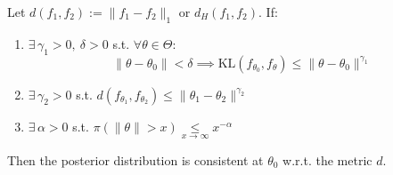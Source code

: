 \documentclass[11pt, a4paper]{article}
\newcommand{\KL}{\mathrm{KL}}
\newcounter{theorem}[section]
\begin{document}
\begin{theorem} \label{thm:param}
Let $d(f_1, f_2) := \|f_1 - f_2\|_1$ or $d_H(f_1, f_2)$. If:
\begin{enumerate}
    \item $\exists\, \gamma_1 > 0,\ \delta > 0$ s.t. $\forall \theta \in \Theta$:
    \[ \|\theta - \theta_0\| < \delta \implies \KL(f_{\theta_0}, f_\theta) \le \|\theta - \theta_0\|^{\gamma_1} \]
    \item $\exists\, \gamma_2 > 0$ s.t. $d(f_{\theta_1}, f_{\theta_2}) \le \|\theta_1 - \theta_2\|^{\gamma_2}$
    \item $\exists\, \alpha > 0$ s.t. $\pi(\|\theta\| > x) \underset{x \to \infty}{\le} x^{-\alpha}$
\end{enumerate}
Then the posterior distribution is consistent at $\theta_0$ w.r.t. the metric $d$.
\end{theorem}
\end{document}
